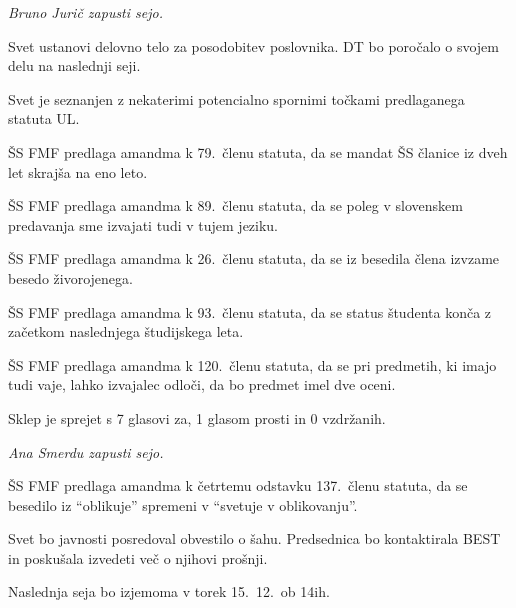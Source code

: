 \documentclass{seja}
\begin{document}
\begin{ad}
\textit{Bruno Jurič zapusti sejo.}

\item
Svet ustanovi delovno telo za posodobitev poslovnika.
DT bo poročalo o svojem delu na naslednji seji.

\item Svet je seznanjen z nekaterimi potencialno spornimi točkami predlaganega statuta UL.

\begin{sklep*}
ŠS FMF predlaga amandma k 79.~členu statuta, da se mandat ŠS članice
iz dveh let skrajša na eno leto.
\end{sklep*}

\begin{sklep*}
ŠS FMF predlaga amandma k 89.~členu statuta, da se poleg v
slovenskem predavanja sme izvajati tudi v tujem jeziku.
\end{sklep*}

\begin{sklep*}
ŠS FMF predlaga amandma k 26.~členu statuta,
da se iz besedila člena izvzame besedo živorojenega.
\end{sklep*}

\begin{sklep*}
ŠS FMF predlaga amandma k 93.~členu statuta,
da se status študenta konča z začetkom naslednjega študijskega leta.
\end{sklep*}

\begin{sklep}
ŠS FMF predlaga amandma k 120.~členu statuta,
da se pri predmetih, ki imajo tudi vaje, lahko izvajalec odloči,
da bo predmet imel dve oceni.
\end{sklep}
Sklep je sprejet s 7 glasovi za, 1 glasom prosti in 0 vzdržanih.

\textit{Ana Smerdu zapusti sejo.}

\begin{sklep*}
ŠS FMF predlaga amandma k četrtemu odstavku 137.~členu statuta,
da se besedilo iz ``oblikuje'' spremeni v ``svetuje v oblikovanju''.
\end{sklep*}

\item
Svet bo javnosti posredoval obvestilo o šahu. Predsednica bo kontaktirala
BEST in poskušala izvedeti več o njihovi prošnji.

Naslednja seja bo izjemoma v torek 15.~12.~ob 14ih.

\end{ad}
\end{document}
